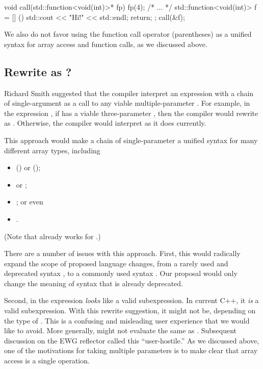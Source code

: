 \documentclass{wg21}
\begin{document}
\begin{colorblock}
void call(std::function<void(int)>* fp) {
    fp(4);
}
/* ... */
std::function<void(int)> f = [] () {
    std::cout << "Hi!" << std::endl;
    return;
};
call(&f);
\end{colorblock}

We also do not favor using the function call operator (parentheses) as a unified syntax for array access and function calls, as we discussed above.

\subsection{Rewrite \tcode{a[x][y]][z]} as ?}

Richard Smith suggested that the compiler interpret an expression with a chain of single-argument  as a call to any viable multiple-parameter .  For example, in the expression , if  has a viable three-parameter , then the compiler would rewrite  as .  Otherwise, the compiler would interpret  as it does currently.  

This approach would make a chain of single-parameter  a unified syntax for many different array types, including

\begin{itemize}
\item {} () or  ();
\item {} or ;
\item {}; or even
\item {}.
\end{itemize}

(Note that  already works for .)  

There are a number of issues with this approach.  First, this would radically expand the scope of proposed language changes, from a rarely used and deprecated syntax , to a commonly used syntax .  Our proposal would only change the meaning of syntax that is already deprecated.

Second,  in the expression  \emph{looks} like a valid subexpression.  In current C++, it \emph{is} a valid subexpression.  With this rewrite suggestion, it might not be, depending on the type of .  This is a confusing and misleading user experience that we would like to avoid.  More generally,  might not evaluate the same as .  Subsequent discussion on the EWG reflector called this ``user-hostile.''  As we discussed above, one of the motivations for  taking multiple parameters is to make clear that array access is a single operation.
\end{document}
